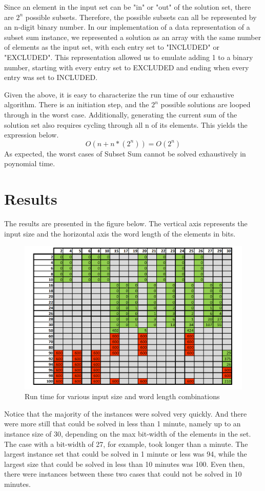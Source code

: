 \documentclass{report}
\begin{document}
Since an element in the input set can be "in" or
"out" of the solution set, there are $2^{n}$ possible subsets. Therefore, the possible
subsets can all be represented by an n-digit binary number. In our implementation of a 
data representation of a subset sum instance, we represented a solution as an array with
the same number of elements as the input set, with each entry set to "INCLUDED" or
"EXCLUDED". This representation allowed us to emulate adding 1 to a binary number,
starting with every entry set to EXCLUDED and ending when every entry was set to INCLUDED.

Given the above, it is easy to characterize the run time of our exhaustive algorithm.
There is an initiation step, and the $2^{n}$ possible solutions are looped through in the worst case. 
Additionally, generating the current sum of the solution set also requires cycling through all n of its elements. 
This yields the expression below.
$$O(n + n*(2^{n})) = O(2^{n})$$
As expected, the worst cases of Subset Sum cannot be solved exhaustively in poynomial time.

\section{Results}

The results are presented in the figure below. The vertical axis represents the
input size and the horizontal axis the word length of the elements in bits.

\begin{figure}[h]
\centering
\includegraphics[width=12cm]{P1_res.png}
\caption{Run time for various input size and word length combinations}
\end{figure}

Notice that the majority of the instances were solved very quickly. And there were more
still that could be solved in less than 1 minute, namely up to an instance size of 30,
depending on the max bit-width of the elements in the set. The case with a bit-width
of 27, for example, took longer than a minute. The largest instance set that could
be solved in 1 minute or less was 94, while the largest size that could
be solved in less than 10 minutes was 100. Even then, there were instances between these
two cases that could not be solved in 10 minutes. 
\end{document}

